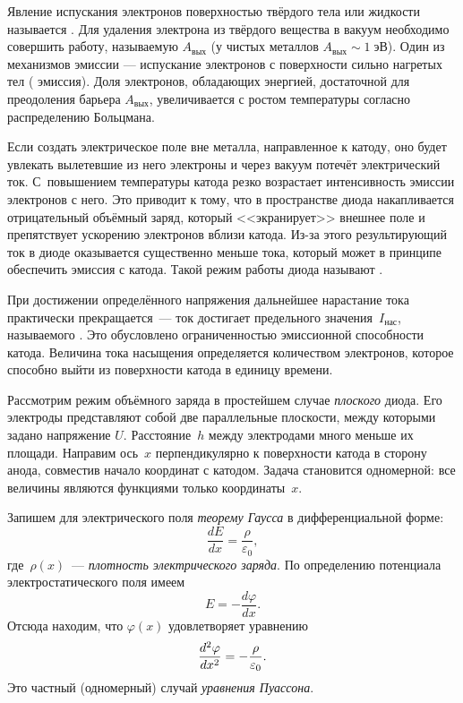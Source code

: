 Явление испускания электронов поверхностью твёрдого тела или жидкости называется
. Для удаления электрона из твёрдого вещества в
вакуум необходимо совершить работу, называемую  $A_{вых}$
(у чистых металлов $A_{вых}\sim 1\;эВ$).
Один из механизмов эмиссии --- испускание электронов с поверхности сильно
нагретых тел ( эмиссия). 
Доля электронов, обладающих энергией, достаточной для преодоления барьера
$A_{вых}$, увеличивается с ростом температуры согласно 
распределению Больцмана.


Если создать электрическое поле вне металла, направленное к катоду, 
оно будет увлекать вылетевшие из него электроны 
и через вакуум потечёт электрический ток.
С~повышением температуры катода резко возрастает интенсивность эмиссии электронов с него. 
Это приводит к тому, что в пространстве диода
накапливается отрицательный
объёмный заряд, который  <<экранирует>> внешнее поле и препятствует ускорению электронов
вблизи катода. Из-за этого результирующий ток в диоде оказывается существенно меньше тока, 
который может в принципе обеспечить эмиссия с катода. 
Такой режим работы диода называют .

При достижении определённого напряжения дальнейшее нарастание тока практически
прекращается~--- ток достигает предельного значения~$I_{нас}$, называемого
. Это обусловлено ограниченностью эмиссионной способности
катода. Величина тока насыщения определяется количеством электронов,
которое способно выйти из поверхности катода в единицу времени.

\label{sec:32}

Рассмотрим режим объёмного заряда в простейшем случае \emph{плоского}
диода. Его электроды представляют собой две параллельные плоскости,
между которыми задано напряжение $U$. Расстояние~$h$ между электродами много
меньше их площади. Направим ось~$x$ перпендикулярно к поверхности катода
в сторону анода, совместив начало координат с катодом. Задача
становится одномерной: все величины являются функциями только координаты~$x$.

Запишем для электрического поля \emph{теорему Гаусса} в дифференциальной
форме:
\[
\frac{dE}{dx} = \frac{\rho}{\varepsilon_0},
\]
где~$\rho(x)$~--- \emph{плотность электрического заряда}. По определению
потенциала электростатического поля имеем
\[
E = -\frac{d\varphi}{dx}.
\]
Отсюда находим, что $\varphi(x)$ удовлетворяет уравнению
\begin{equation}
    \eqmark{3.14}
    \frac{d^2\varphi}{dx^2}=-\frac{\rho}{\varepsilon_0}.
\end{equation}
Это частный (одномерный) случай \emph{уравнения Пуассона}.

